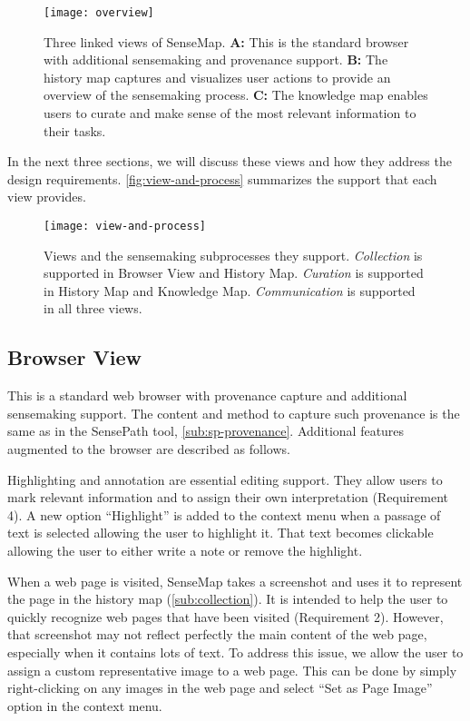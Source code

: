 \begin{figure}[!htb]
 	\centering
 	\texttt{[image: overview]}
 	\caption{Three linked views of SenseMap. \textbf{A:} This is the standard browser with additional sensemaking and provenance support. \textbf{B:} The history map captures and visualizes user actions to provide an overview of the sensemaking process. \textbf{C:} The knowledge map enables users to curate and make sense of the most relevant information to their tasks.}
 	\label{fig:sm-overview}
\end{figure}

In the next three sections, we will discuss these views and how they address the design requirements. \autoref{fig:view-and-process} summarizes the support that each view provides.

\begin{figure}[!htb]
	\centering
	\texttt{[image: view-and-process]}
	\caption{Views and the sensemaking subprocesses they support. \emph{Collection} is supported in Browser View and History Map. \emph{Curation} is supported in History Map and Knowledge Map. \emph{Communication} is supported in all three views.}
	\label{fig:view-and-process}
\end{figure}

\subsection{Browser View}
This is a standard web browser with provenance capture and additional sensemaking support. The content and method to capture such provenance is the same as in the SensePath tool, \autoref{sub:sp-provenance}. Additional features augmented to the browser are described as follows.

Highlighting and annotation are essential editing support. They allow users to mark relevant information and to assign their own interpretation (Requirement 4). A new option ``Highlight'' is added to the context menu when a passage of text is selected allowing the user to highlight it. That text becomes clickable allowing the user to either write a note or remove the highlight.

When a web page is visited, SenseMap takes a screenshot and uses it to represent the page in the history map (\autoref{sub:collection}). It is intended to help the user to quickly recognize web pages that have been visited (Requirement 2). However, that screenshot may not reflect perfectly the main content of the web page, especially when it contains lots of text. To address this issue, we allow the user to assign a custom representative image to a web page. This can be done by simply right-clicking on any images in the web page and select ``Set as Page Image'' option in the context menu.

